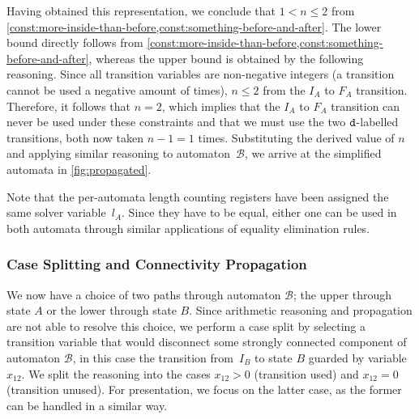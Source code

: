 Having obtained this representation, we conclude that $1 < n \leq 2$
from
\cref{const:more-inside-than-before,const:something-before-and-after}. The
lower bound directly follows from
\cref{const:more-inside-than-before,const:something-before-and-after},
whereas the upper bound is obtained by the following reasoning. Since all
transition variables are non-negative integers (a transition cannot be
used a negative amount of times), $n \leq 2$ from the $I_A$ to $F_A$
transition. Therefore, it follows that $n=2$, which implies that the
$I_A$ to $F_A$ transition can never be used under these constraints
and that we must use the two $\texttt{d}$-labelled transitions, both now
taken $n-1 =1$ times.
%
Substituting the derived value of $n$ and applying similar
reasoning to automaton~$\mathcal{B}$, we arrive at the simplified
automata in \cref{fig:propagated}.


Note that the per-automata length counting registers have been assigned the same
solver variable~$l_A$. Since they have to be equal, either one can be used in
both automata through similar applications of equality elimination rules.


\subsubsection{Case Splitting and Connectivity Propagation}\label{sec:intuition:split}
We now have a choice of two paths through automaton $\mathcal{B}$; the
upper through state $A$ or the lower through state $B$. Since
arithmetic reasoning and propagation are not able to resolve this choice,
we perform a case split by selecting a transition variable that would disconnect
some strongly connected component of automaton $\mathcal{B}$, in this case the transition
from~$I_B$ to state $B$ guarded by variable~$x_{12}$.
 We split the reasoning into the cases $x_{12} > 0$ (transition used)
and $x_{12} = 0$ (transition unused). For presentation, we focus
on the latter case, as the former can be handled in a similar way.

